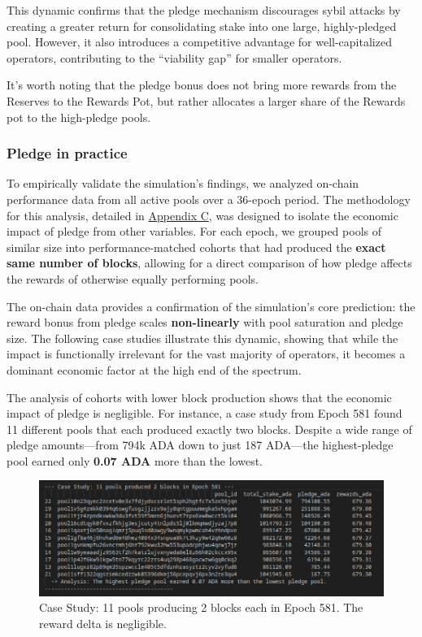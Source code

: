 \documentclass[11pt, letterpaper]{article}
\begin{document}
This dynamic confirms that the pledge mechanism discourages sybil attacks by
creating a greater return for consolidating stake into one large,
highly-pledged pool. However, it also introduces a competitive advantage for
well-capitalized operators, contributing to the ``viability gap'' for smaller
operators.

It's worth noting that the pledge bonus does not bring more rewards from the
Reserves to the Rewards Pot, but rather allocates a larger share of the Rewards
pot to the high-pledge pools.

\subsubsection{Pledge in practice}

To empirically validate the simulation's findings, we analyzed on-chain
performance data from all active pools over a 36-epoch period. The methodology
for this analysis, detailed in \href{https://github.com/input-output-hk/spo-incentives/blob/main/spo_incentives/appendixC.txt}{Appendix C}, 
was designed to isolate the economic impact of pledge from other variables. For each epoch, we grouped pools of
similar size into performance-matched cohorts that had produced the
\textbf{exact same number of blocks}, allowing for a direct comparison of how
pledge affects the rewards of otherwise equally performing pools.

The on-chain data provides a confirmation of the simulation's core prediction: the reward
bonus from pledge scales \textbf{non-linearly} with pool saturation and pledge size.
The following case studies illustrate this dynamic, showing that while the impact is functionally
irrelevant for the vast majority of operators, it becomes a dominant economic
factor at the high end of the spectrum.

The analysis of cohorts with lower block production shows that the economic
impact of pledge is negligible. For instance, a case study from Epoch 581 found
11 different pools that each produced exactly two blocks. Despite a wide range
of pledge amounts—from 794k ADA down to just 187 ADA—the highest-pledge pool
earned only \textbf{0.07 ADA} more than the lowest.

\begin{figure}[H]
	\centering
	\includegraphics[width=\textwidth]{img/2blocks-e581.png}
	\caption{Case Study: 11 pools producing 2 blocks each in Epoch 581. The reward delta is negligible.}
	\label{fig:2blocks-e581}
\end{figure}
\end{document}
